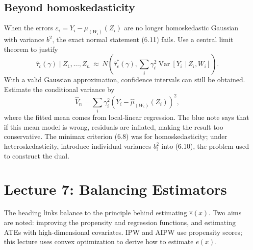 \subsection{Beyond homoskedasticity}
When the errors $\varepsilon_i=Y_i-\mu_{(W_i)}(Z_i)$ are no longer homoskedastic Gaussian with variance $b^2$, the exact normal statement (6.11) fails. Use a central limit theorem to justify
\[
\widehat\tau_c(\gamma)\mid Z_1,\ldots,Z_n
\ \approx\ N\left(\widehat\tau_c^*(\gamma),
\sum_i\gamma_i^2\operatorname{Var}[Y_i\mid Z_i,W_i]\right).
\tag{6.14 in the notes}
\]
With a valid Gaussian approximation, confidence intervals can still be obtained. Estimate the conditional variance by
\[
\widehat V_n=\sum_i\gamma_i^2(Y_i-\widehat\mu_{(W_i)}(Z_i))^2,
\]
where the fitted mean comes from local-linear regression. The blue note says that if this mean model is wrong, residuals are inflated, making the result too conservative. The minimax criterion (6.8) was for homoskedasticity; under heteroskedasticity, introduce individual variances $b_i^2$ into (6.10), the problem used to construct the dual.
\section{Lecture 7: Balancing Estimators}
The heading links balance to the principle behind estimating $\widehat e(x)$. Two aims are noted: improving the propensity and regression functions, and estimating ATEs with high-dimensional covariates. IPW and AIPW use propensity scores; this lecture uses convex optimization to derive how to estimate $e(x)$.
